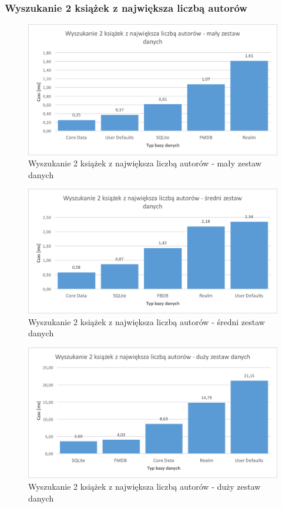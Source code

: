 \subsubsection{Wyszukanie 2 książek z największa liczbą autorów}

\begin{figure}[H]
\centering
	\includegraphics[width=15cm]{img/read_data/read_by_books/read_by_books_small_test.png}
	\caption{Wyszukanie 2 książek z największa liczbą autorów - mały zestaw danych}
	\label{fig: read-by-books-small}
\end{figure}

\begin{figure}[H]
\centering
	\includegraphics[width=15cm]{img/read_data/read_by_books/read_by_books_medium_test.png}
	\caption{Wyszukanie 2 książek z największa liczbą autorów - średni zestaw danych}
	\label{fig: read-by-books-medium}
\end{figure}

\begin{figure}[H]
\centering
	\includegraphics[width=15cm]{img/read_data/read_by_books/read_by_books_big_test.png}
	\caption{Wyszukanie 2 książek z największa liczbą autorów - duży zestaw danych}
	\label{fig: read-by-books-big}
\end{figure}

